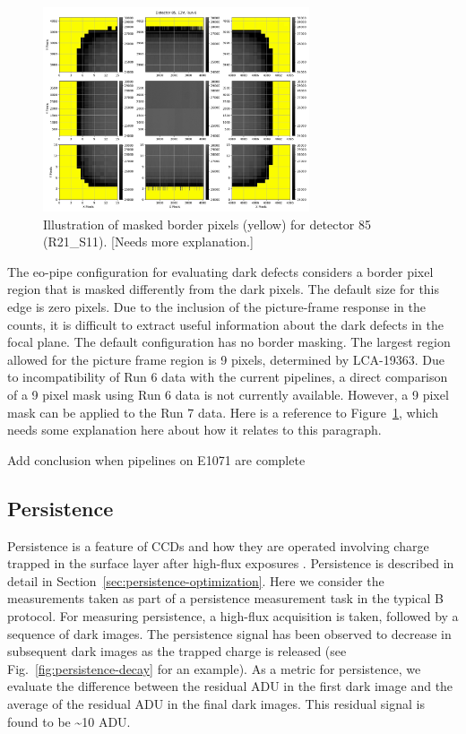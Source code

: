 \begin{figure}[H]
\begin{centering}
\includegraphics[width=0.7\textwidth]{figures/baselineCharacterization/detector_85.jpg}
\caption{Illustration of masked border pixels (yellow) for detector 85 (R21\_S11). [Needs more explanation.]}
\label{fig:fig-edge-mask}
\end{centering}
\end{figure}

The eo-pipe configuration for evaluating dark defects considers a border pixel
region that is masked differently from the dark pixels. The default size for this edge is zero pixels. Due to the inclusion of the picture-frame response in the counts, it is difficult to
extract useful information about the dark defects in the focal plane. The default
configuration has no border masking. The largest region allowed for the
picture frame region is 9 pixels, determined by LCA-19363. Due to incompatibility of Run 6 data with the current pipelines, a direct comparison of a 9 pixel mask using Run 6 data is not currently available. However, a 9
pixel mask can be applied to the Run 7 data.  Here is a reference to Figure~\ref{fig:fig-edge-mask}, which needs some explanation here about how it relates to this paragraph.

Add conclusion when pipelines on E1071 are complete

\subsection{Persistence}\label{persistence}

Persistence is a feature of CCDs and how they are operated involving charge trapped in the
surface layer after high-flux exposures \cite{dmtn-276}.
Persistence is described in detail in Section~\ref{sec:persistence-optimization}.
Here we consider the measurements taken as
part of a persistence measurement task in the typical B protocol. For
measuring persistence, a high-flux acquisition is taken, followed by a
sequence of dark images. The persistence signal has been observed to
decrease in subsequent dark images as the trapped charge is released (see Fig.~\ref{fig:persistence-decay} for an example). As a metric for persistence,
we evaluate the difference between the residual ADU in the first dark
image and the average of the residual ADU in the final dark images. This residual signal is found to be \textasciitilde10 ADU.

